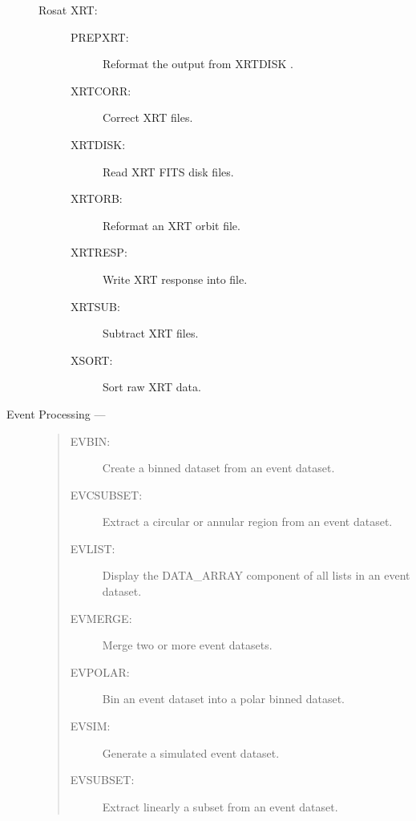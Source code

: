 \begin{description}
\begin{description}
\item [Rosat XRT:]\hfill
\begin{description}
\item [PREPXRT:]   Reformat the output from XRTDISK .
\item [XRTCORR:]   Correct XRT files.
\item [XRTDISK:]   Read XRT FITS disk files.
\item [XRTORB:]    Reformat an XRT orbit file.
\item [XRTRESP:]   Write XRT response into file.
\item [XRTSUB:]    Subtract XRT files.
\item [XSORT:]     Sort raw XRT data.
\end{description}
\end{description}

\item [Event Processing ---]
\begin{quote}
\begin{description}
\item [EVBIN:]  Create a binned dataset from an event dataset.
\item [EVCSUBSET:]  Extract a circular or annular region from an event dataset.
\item [EVLIST:]  Display the DATA\_ARRAY component of all lists in an event dataset.
\item [EVMERGE:]  Merge two or more event datasets.
\item [EVPOLAR:]   Bin an event dataset into a polar binned dataset.
\item [EVSIM:]  Generate a simulated event dataset.
\item [EVSUBSET:]  Extract linearly a subset from an event dataset.
\end{description}
\end{quote}


\end{description}
